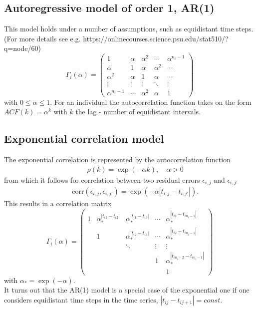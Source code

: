 \subsection*{Autoregressive model of order 1, AR(1)}
This model holds under a number of assumptions, such as equidistant time steps. (For more details see e.g. https://onlinecourses.science.psu.edu/stat510/?q=node/60)
\[
 \Gamma_i(\alpha) =
 \begin{pmatrix}
 1 			& \alpha 	& \alpha^2 	& \cdots 		& \alpha^{n_i-1} \\
\alpha 		& 1 		& \alpha 		& \alpha^2 	& \cdots \\
\alpha^2		& \alpha	& 1 			& \alpha 		& \cdots \\
\vdots		& \vdots	& \vdots		& \ddots		& \vdots \\
\alpha^{n_i-1}	& \cdots	& \alpha^2	&  \alpha		& 1 	
 \end{pmatrix}
\]
with $0 \le \alpha \le 1$. For an individual the autocorrelation function takes on the form $ACF(k) = \alpha^k$ with $k$ the lag - number of equidistant intervals. 

\subsection*{Exponential correlation model}
The exponential correlation is represented by the autocorrelation function
\begin{eqnarray}
&&  \rho(k) = \exp(-\alpha k), \quad	\alpha > 0 \nonumber 
\end{eqnarray}	
from which it follows for correlation between two residual errors $\epsilon_{i,j}$ and  $\epsilon_{i,j'}$
\begin{eqnarray}
&&  \text{corr}(\epsilon_{i,j},\epsilon_{i,j'}) = \exp(-\alpha |t_{i,j} - t_{i,j'}|). \nonumber
\end{eqnarray}
This results in a correlation matrix
\[
 \Gamma_i(\alpha) =
 \begin{pmatrix}
  	1 		& \alpha_*^{|t_{i1} - t_{i2}|} 	& \alpha_*^{|t_{i1} - t_{i3}|} 	& \cdots 	& \alpha_*^{|t_{i1} - t_{in_i-1}|} \\
			& 1 						& \alpha_*^{|t_{i2} - t_{i3}|} 	& \cdots 	& \alpha_*^{|t_{i2} - t_{in_i-1}|} \\
			& 	 					& \ddots					& \vdots 	& \vdots \\
			& 	 					& 						& 1		& \alpha_*^{|t_{in_i-2} - t_{in_i-1}|} \\
			& 						& 						& 		& 1 	
 \end{pmatrix}
\]
with $\alpha_* = \exp(-\alpha)$. \\
It turns out that the AR(1) model is a special case of the exponential one if one considers equidistant time steps in the time series, $|t_{ij} - t_{ij+1}| = const$.

